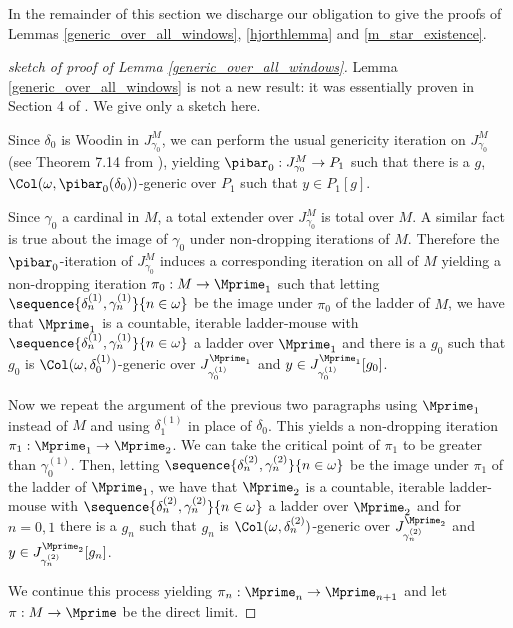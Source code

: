 \documentclass[oneside,12pt]{amsart}
\begin{document}
In the remainder of this section we discharge our obligation to give the proofs of
Lemmas \ref{generic_over_all_windows}, \ref{hjorthlemma} and
\ref{m_star_existence}.

\begin{proof}[sketch of proof of Lemma \ref{generic_over_all_windows}]
Lemma \ref{generic_over_all_windows} is not a new result: it was essentially
proven in Section 4 of \cite{Mouse_Sets}. We give only a sketch here.

Since $\delta_0$ is Woodin in $J^M_{\gamma_0}$,
we can perform the usual genericity iteration on $J^M_{\gamma_0}$
(see Theorem 7.14 from \cite{Outline}), yielding
$\pibar_0:J^M_{\gamma_0}\to P_1$ such that
there is a $g$, $\Col(\omega,\pibar_0(\delta_0))$-generic over $P_1$ such that $y\in P_1[g]$.

Since $\gamma_0$ a cardinal in $M$, a total extender over $J^M_{\gamma_0}$ is total
over $M$. A similar fact is true about the image of $\gamma_0$ under non-dropping
iterations of $M$.
Therefore the $\pibar_0$-iteration of $J^M_{\gamma_0}$ induces a corresponding iteration on all of $M$
yielding a non-dropping iteration $\pi_0:M\to \Mprime_1$ such that
letting $\sequence{\delta^{(1)}_n,\gamma^{(1)}_n}{n\in\omega}$ be the image under $\pi_0$
of the ladder of $M$, we have that $\Mprime_1$ is a countable, iterable ladder-mouse
with $\sequence{\delta^{(1)}_n,\gamma^{(1)}_n}{n\in\omega}$ a ladder over $\Mprime_1$
and there is a $g_0$ such that $g_0$
is $\Col(\omega,\delta^{(1)}_0)$-generic over
$J^{\Mprime_1}_{\gamma^{(1)}_0}$ and $y\in J^{\Mprime_1}_{\gamma^{(1)}_0}[g_0]$.

Now we repeat the argument of the previous two paragraphs using $\Mprime_1$ instead of $M$
and using $\delta^{(1)}_1$ in place of $\delta_0$. This yields a non-dropping iteration
$\pi_1:\Mprime_1\to\Mprime_2$. We can take the critical point of $\pi_1$ to be
greater than $\gamma^{(1)}_0$. Then,
letting $\sequence{\delta^{(2)}_n,\gamma^{(2)}_n}{n\in\omega}$ be the image under $\pi_1$
of the ladder of $\Mprime_1$, we have that $\Mprime_2$ is a countable, iterable ladder-mouse
with $\sequence{\delta^{(2)}_n,\gamma^{(2)}_n}{n\in\omega}$ a ladder over $\Mprime_2$
and for $n=0,1$ there is a $g_n$ such that $g_n$
is $\Col(\omega,\delta^{(2)}_n)$-generic over
$J^{\Mprime_2}_{\gamma^{(2)}_n}$ and $y\in J^{\Mprime_2}_{\gamma^{(2)}_n}[g_n]$.

We continue this process yielding $\pi_n:\Mprime_n\to\Mprime_{n+1}$ and
let $\pi:M\to\Mprime$ be the direct limit.

\end{proof}
\end{document}
